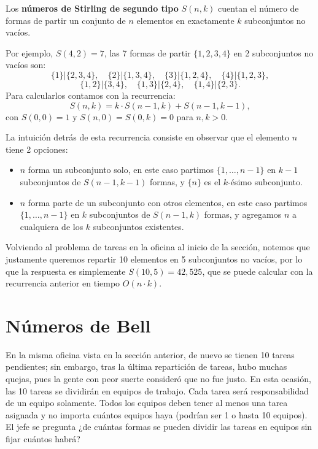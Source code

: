 Los \textbf{números de Stirling de segundo tipo} $S(n,k)$ cuentan el número de formas de partir un conjunto de $n$ elementos en exactamente $k$ subconjuntos no vacíos.
 
Por ejemplo, $S(4,2) = 7$, las 7 formas de partir $\{1,2,3,4\}$ en 2 subconjuntos no vacíos son:
\[
\{1\}|\{2,3,4\},\quad \{2\}|\{1,3,4\},\quad \{3\}|\{1,2,4\},\quad \{4\}|\{1,2,3\},
\]
\[
\{1,2\}|\{3,4\},\quad \{1,3\}|\{2,4\},\quad \{1,4\}|\{2,3\}.
\]
Para calcularlos contamos con la recurrencia:
\[
S(n,k) = k \cdot S(n-1,k) + S(n-1,k-1),
\]
con $S(0,0) = 1$ y $S(n,0) = S(0,k) = 0$ para $n,k > 0$.
 
La intuición detrás de esta recurrencia consiste en observar que el elemento $n$ tiene 2 opciones:
\begin{itemize}
    \item $n$ forma un subconjunto solo, en este caso partimos $\{1,\ldots,n-1\}$ en $k-1$ subconjuntos de $S(n-1,k-1)$ formas, y $\{n\}$ es el $k$-ésimo subconjunto.
    \item $n$ forma parte de un subconjunto con otros elementos, en este caso partimos $\{1,\ldots,n-1\}$ en $k$ subconjuntos de $S(n-1,k)$ formas, y agregamos $n$ a cualquiera de los $k$ subconjuntos existentes.
\end{itemize}

Volviendo al problema de tareas en la oficina al inicio de la sección, notemos que justamente queremos repartir 10 elementos en 5 subconjuntos no vacíos, por lo que la respuesta es simplemente $S(10,5)=42,525$, que se puede calcular con la recurrencia anterior en tiempo $O(n\cdot k)$.
 
\section{Números de Bell\adv}
 
En la misma oficina vista en la sección anterior, de nuevo se tienen 10 tareas pendientes; sin embargo, tras la última repartición de tareas, hubo muchas quejas, pues la gente con peor suerte consideró que no fue justo. En esta ocasión, las 10 tareas se dividirán en equipos de trabajo. Cada tarea será responsabilidad de un equipo solamente. Todos los equipos deben tener al menos una tarea asignada y no importa cuántos equipos haya (podrían ser 1 o hasta 10 equipos). El jefe se pregunta ¿de cuántas formas se pueden dividir las tareas en equipos sin fijar cuántos habrá?

